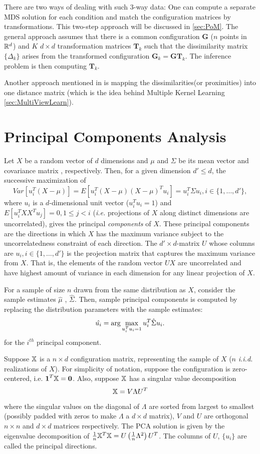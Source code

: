 \documentclass[12pt,oneside,final]{thesis}\usepackage[]{graphicx}\usepackage[]{color}
\begin{document}
There are two ways of dealing with such 3-way data: One can compute a separate MDS solution for  each condition and match the configuration matrices by transformations. This two-step approach will be discussed in \autoref{sec:PoM}. The general approach assumes that there is a common configuration $\mathbf{G}$ ($n$ points in $\mathbb{R}^{d}$) and $K$ $d \times d$ transformation matrices ${\mathbf{T}_k}$ such that the dissimilarity matrix $\{\Delta_k\}$ arises  from the transformed configuration $\mathbf{G}_k =\mathbf{G}\mathbf{T}_k$. The inference problem is then computing $\mathbf{T}_k$.

Another approach mentioned in \cite{borg+groenen:1997} is  mapping the dissimilarities(or proximities) into one distance matrix (which is the idea behind Multiple Kernel Learning \ref{sec:MultiViewLearn}).


\section{Principal Components Analysis}
Let $X$ be a random vector of   $d$ dimensions and $\mu$ and $\Sigma$ be its mean vector and covariance matrix , respectively. Then, for a given dimension $d'\leq d$, the successive maximization of  $$Var[u_{i}^T (X-\mu)]= E[u_{i}^T (X-\mu)(X-\mu)^T u_i]=u_{i}^T\Sigma u_{i},  i \in \{1,\ldots,d'\},$$ where $u_{i}$ is a  $d$-dimensional unit vector ($u_i^Tu_i=1$)  and $E[u_{i}^T X X^T u_j]=0 , 1\leq j<i$ (\textit{i.e.} projections of $X$ along distinct dimensions are uncorrelated), gives the principal \emph{components} of $X$. These principal components are the directions in which $X$ has the maximum variance subject to the uncorrelatedness constraint of each direction. The $d' \times d$-matrix $U$ whose columns are $u_i, i \in \{1,\ldots,d'\}$  is the projection matrix that captures the maximum variance from $X$. That is, the elements of the random vector $UX$ are uncorrelated and have highest amount of variance in each dimension for any linear projection of $X$.

For a sample of size $n$ drawn from the same distribution as $X$, consider the sample estimates $\hat{\mu}$ ,  $\hat{\Sigma} $. Then, sample principal components  is computed by replacing the distribution parameters with the sample estimates:
 \[\hat{u_i}=\arg\max_{u_i^Tu_i=1} u_{i}^T \hat{\Sigma}u_i. \]
for the $i^{th}$ principal component.

Suppose $\mathbb{X}$ is a $n \times d$ configuration matrix, representing the sample of $X$ ($n$ \textit{i.i.d.} realizations of $X$). For simplicity of notation, suppose the configuration is zero-centered, i.e. $\mbox{{\bf 1}} ^T \mathbb{X}  = \bm{0}$. Also, suppose $\mathbb{X}$ has a singular value decomposition $$\mathbb{X}= V\Lambda U^T$$ where the singular values on the diagonal of $\Lambda$ are sorted from largest to smallest (possibly padded with zeros to make $\Lambda$  a $d \times d$ matrix), $V$ and $U$ are orthogonal $n \times n$ and $d \times d$ matrices respectively. The PCA solution is  given by the eigenvalue decomposition of 
$\frac{1}{n} {\mathbb{X}}^T \mathbb{X}=U \left( \frac{1}{n} \Lambda^2 \right) U^T$. The columns of $U$, $\{ u_i \}$ are called the principal directions. 
\end{document}
